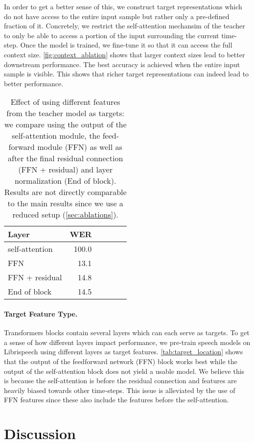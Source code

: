 \documentclass[nohyperref]{article}
\theoremstyle{plain}
\theoremstyle{definition}
\theoremstyle{remark}
\newcommand{\libri}{Librispeech}
\newcommand{\insertTargetFeatureAblation}{
\begin{table}[t]
\centering
\caption{Effect of using different features from the teacher model as targets: 
we compare using the output of the self-attention module, the feed-forward module (FFN) as well as after the final residual connection (FFN + residual) and layer normalization (End of block).
Results are not directly comparable to the main results since we use a reduced setup (\textsection\ref{sec:ablations}).
}
\label{tab:target_location}
\begin{tabular}[t]{lrrrrr}
\toprule
Layer & WER \\
\midrule
self-attention & 100.0 \\
FFN & 13.1 \\
FFN + residual & 14.8 \\
End of block & 14.5 \\
\bottomrule
\end{tabular}
\end{table}
}
\begin{document}
In order to get a better sense of this, we construct target representations which do not have access to the entire input sample but rather only a pre-defined fraction of it.
Concretely, we restrict the self-attention mechansim of the teacher to only be able to access a portion of the input surrounding the current time-step.
Once the model is trained, we fine-tune it so that it can access the full context size.
\autoref{fig:context_ablation} shows that larger context sizes lead to better downstream performance. 
The best accuracy is achieved when the entire input sample is visible.
This shows that richer target representations can indeed lead to better performance.

\insertTargetFeatureAblation


\paragraph{Target Feature Type.}
Transformers blocks contain several layers which can each serve as targets.
To get a sense of how different layers impact performance, we pre-train speech models on \libri{} using different layers as target features.
\autoref{tab:target_location} shows that the output of the feedforward network (FFN) block works best while the output of the self-attention block does not yield a usable model.
We believe this is because the self-attention is before the residual connection and features are heavily biased towards other time-steps. 
This issue is alleviated by the use of FFN features since these also include the features before the self-attention.




\section{Discussion}
\end{document}
